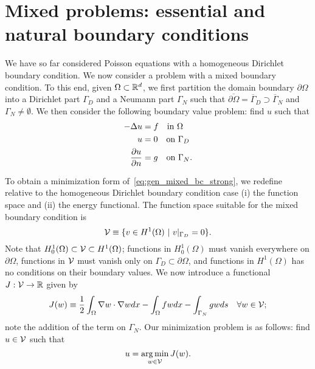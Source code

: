 \section{Mixed problems: essential and natural boundary conditions}
\label{sec:gen_mixed}
We have so far considered Poisson equations with a homogeneous Dirichlet boundary condition.  We now consider a problem with a mixed boundary condition. To this end, given $\Omega \subset \mathbb{R}^d$, we first partition the domain boundary $\partial \Omega$ into a Dirichlet part $\Gamma_D$ and a Neumann part $\Gamma_N$ such that $\overline{\partial \Omega} = \overline \Gamma_D \supset \overline \Gamma_N$ and $\Gamma_N \neq \emptyset$.  We then consider the following boundary value problem: find $u$ such that
\begin{align}
  -\Delta u &= f \quad \text{in } \Omega \notag \\
  u &= 0 \quad \text{on } \Gamma_D \label{eq:gen_mixed_bc_strong} \\
  \frac{\partial u}{\partial n} &= g \quad \text{on } \Gamma_N. \notag
\end{align}

To obtain a minimization form of~\eqref{eq:gen_mixed_bc_strong}, we redefine relative to the homogeneous Dirichlet boundary condition case (i) the function space and (ii) the energy functional.  The function space suitable for the mixed boundary condition is
\begin{equation}
  \calV \equiv \{ v \in H^1(\Omega) \ | \ v|_{\Gamma_D} = 0 \}.
  \label{eq:gen_mixed_bc_space}
\end{equation}
Note that $H^1_0(\Omega) \subset \mathcal{V} \subset H^1(\Omega)$; functions in $H^1_0(\Omega)$ must vanish everywhere on $\partial \Omega$, functions in $\mathcal{V}$ must vanish only on $\Gamma_D \subset \partial \Omega$, and functions in $H^1(\Omega)$ has no conditions on their boundary values. We now introduce a functional $J: \mathcal{V} \to \mathbb{R}$ given by
\begin{equation}
  J(w) \equiv \frac{1}{2} \int_\Omega \nabla w \cdot \nabla w dx - \int_\Omega f w dx - \int_{\Gamma_N} g w ds \quad \forall w \in \mathcal{V};
  \label{eq:gen_mixed_bc_min_func}
\end{equation}
note the addition of the term on $\Gamma_N$.
Our minimization problem is as follows: find $u \in \mathcal{V}$ such that
\begin{equation}
  u = \operatorname*{arg\,min}_{w \in \mathcal{V}} J(w). \label{eq:gen_mixed_bc_min}
\end{equation}

